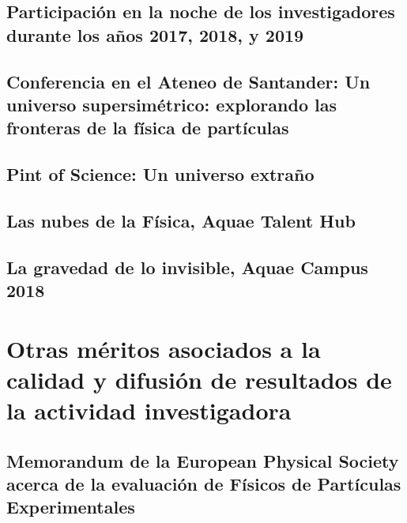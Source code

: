 \documentclass[a4paper, 11pt, twoside, openright]{report}
\begin{document}
\subsection{Participación en la noche de los investigadores durante los años 2017, 2018, y 2019}


\subsection{Conferencia en el Ateneo de Santander: Un universo supersimétrico: explorando las fronteras de la física de partículas}


\subsection{Pint of Science: Un universo extraño}


\subsection{Las nubes de la Física, Aquae Talent Hub}


\subsection{La gravedad de lo invisible, Aquae Campus 2018} 




\section{Otras méritos asociados a la calidad y difusión de resultados de la actividad investigadora}
\subsection{Memorandum de la European Physical Society acerca de la evaluación de Físicos de Partículas Experimentales}

\end{document}
